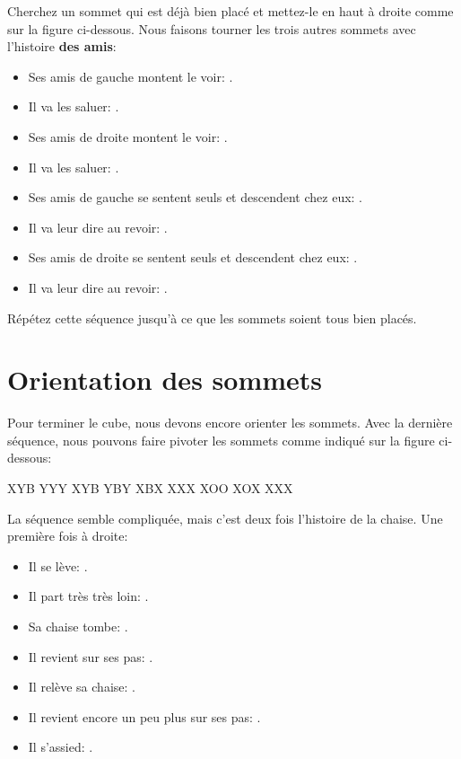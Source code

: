Cherchez un sommet qui est déjà bien placé et mettez-le en haut à droite comme sur la figure ci-dessous. Nous faisons tourner les trois autres sommets avec l'histoire \textbf{des amis}:

\begin{itemize}
	\item Ses amis de gauche montent le voir: .
	\item Il va les saluer:  .
	\item Ses amis de droite montent le voir: .
	\item Il va les saluer: .
	\item Ses amis de gauche se sentent seuls et descendent chez eux: .
	\item Il va leur dire au revoir: .
	\item Ses amis de droite se sentent seuls et descendent chez eux: .
	\item Il va leur dire au revoir: .
\end{itemize}

Répétez cette séquence jusqu'à ce que les sommets soient tous bien placés.

\section{Orientation des sommets}

Pour terminer le cube, nous devons encore orienter les sommets. Avec la dernière séquence, nous pouvons faire pivoter les sommets comme indiqué sur la figure ci-dessous:

\begin{center}	
	\RubikFaceUp%
	{X}{Y}{B}%
	{Y}{Y}{Y}%
	{X}{Y}{B}
	\RubikFaceRight%
	{Y}{B}{Y}%
	{X}{B}{X}%
	{X}{X}{X}
	\RubikFaceFront%
	{X}{O}{O}%
	{X}{O}{X}%
	{X}{X}{X}
\end{center}

La séquence semble compliquée, mais c'est deux fois l'histoire de la chaise. Une première fois à droite:


\begin{itemize}
	\item Il se lève: .
	\item Il part très très loin: .
	\item Sa chaise tombe: .
	\item Il revient sur ses pas: .
	\item Il relève sa chaise: .
	\item Il revient encore un peu plus sur ses pas: .	
	\item Il s'assied: .
\end{itemize}

